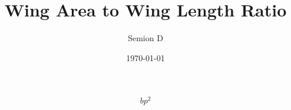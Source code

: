 \documentclass[12pt]{article}
\title{Wing Area to Wing Length Ratio}
\author{Semion D}
\date{\today}
\begin{document}
\maketitle

\[ 
bp^2
\]
\end{document}
